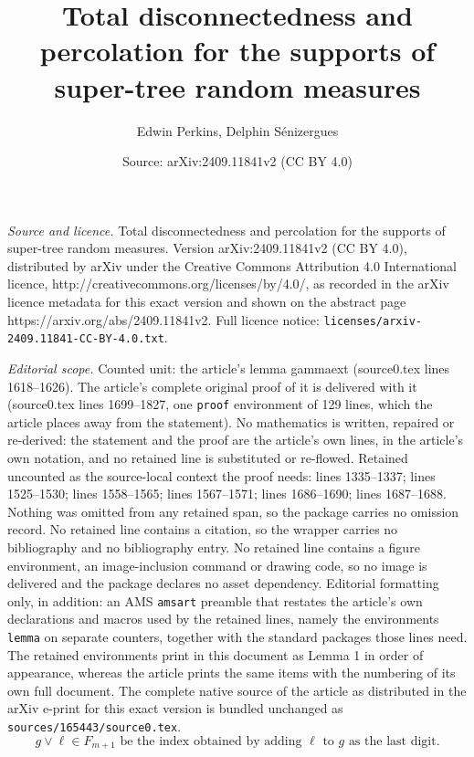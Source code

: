 \documentclass[10pt,a4paper]{amsart}
\title{Total disconnectedness and percolation for the supports of super-tree random measures}
\author{Edwin Perkins, Delphin S\'enizergues}
\date{Source: arXiv:2409.11841v2 (CC BY 4.0)}
\begin{document}
\maketitle

\noindent\emph{Source and licence.} Total disconnectedness and percolation for the supports of super-tree random measures. Version arXiv:2409.11841v2 (CC BY 4.0), distributed by arXiv under the Creative Commons Attribution 4.0 International licence, http://creativecommons.org/licenses/by/4.0/, as recorded in the arXiv licence metadata for this exact version and shown on the abstract page https://arxiv.org/abs/2409.11841v2. Full licence notice: \texttt{licenses/arxiv-2409.11841-CC-BY-4.0.txt}.\par\smallskip

\noindent\textit{Editorial scope.} Counted unit: the article's lemma gammaext (source0.tex lines 1618--1626). The article's complete original proof of it is delivered with it (source0.tex lines 1699--1827, one \texttt{proof} environment of 129 lines, which the article places away from the statement). No mathematics is written, repaired or re-derived: the statement and the proof are the article's own lines, in the article's own notation, and no retained line is substituted or re-flowed.  Retained uncounted as the source-local context the proof needs: lines 1335--1337; lines 1525--1530; lines 1558--1565; lines 1567--1571; lines 1686--1690; lines 1687--1688.  Nothing was omitted from any retained span, so the package carries no omission record.  No retained line contains a citation, so the wrapper carries no bibliography and no bibliography entry.  No retained line contains a figure environment, an image-inclusion command or drawing code, so no image is delivered and the package declares no asset dependency.  Editorial formatting only, in addition: an AMS \texttt{amsart} preamble that restates the article's own declarations and macros used by the retained lines, namely the environments \texttt{lemma} on separate counters, together with the standard packages those lines need.  The retained environments print in this document as Lemma 1 in order of appearance, whereas the article prints the same items with the numbering of its own full document.  The complete native source of the article as distributed in the arXiv e-print for this exact version is bundled unchanged as \texttt{sources/165443/source0.tex}.
\begin{equation}\label{veenotation}
\text{$g\vee \ell\in F_{m+1}$ be the index obtained by adding $\ell$ to $g$ as the last digit.}
\end{equation} 
\end{document}
